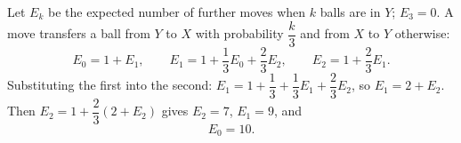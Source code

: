 Let $E_k$ be the expected number of further moves when $k$ balls are in $Y$; $E_3=0$. A move transfers a ball from $Y$ to $X$ with probability $\dfrac k3$ and from $X$ to $Y$ otherwise:
\[E_0=1+E_1,\qquad E_1=1+\dfrac13E_0+\dfrac23E_2,\qquad E_2=1+\dfrac23E_1.\]
Substituting the first into the second: $E_1=1+\dfrac13+\dfrac13E_1+\dfrac23E_2$, so $E_1=2+E_2$. Then $E_2=1+\dfrac23\left(2+E_2\right)$ gives $E_2=7$, $E_1=9$, and
\[E_0=\boxed{10}.\]
